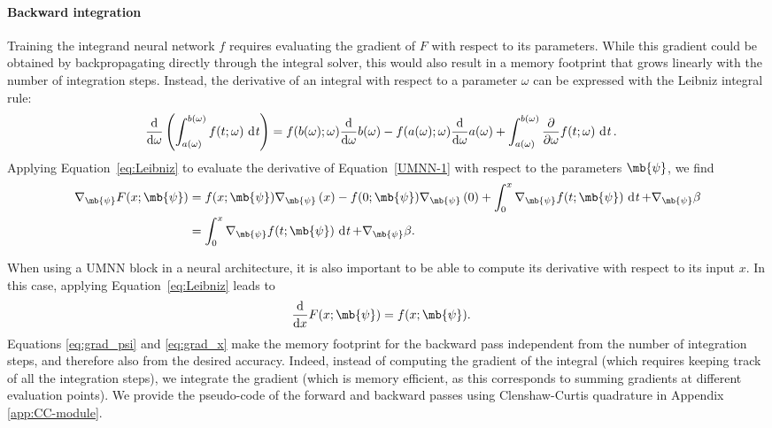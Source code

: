 \paragraph{Backward integration}
Training the integrand neural network $f$ requires evaluating the gradient of $F$ with respect to its parameters. While this gradient could be obtained by backpropagating directly through the integral solver, this would also result in a memory footprint that grows linearly with the number of integration steps. Instead, the derivative of an integral with respect to a parameter $\omega$ can be expressed with the Leibniz integral rule:
\begin{align}
    \frac{\mathrm{d}}{\mathrm{d} \omega}\left({\int^{b(\omega)}_{a(\omega)}f(t; \omega) \operatorname{\, \mathrm{d}\mathit{t}}}\right) &= f(b(\omega); \omega) \frac{\mathrm{d}}{\mathrm{d} \omega}b(\omega) - f(a(\omega);\omega) \frac{\mathrm{d}}{\mathrm{d}\omega}a(\omega) + \int^{b(\omega)}_{a(\omega)} \frac{\partial}{\partial \omega}f(t; \omega) \operatorname{\, \mathrm{d}\mathit{t}}. \label{eq:Leibniz}
\end{align}
Applying Equation~\eqref{eq:Leibniz} to evaluate the derivative of Equation~\eqref{UMNN-1} with respect to the parameters $\mb{\psi}$, we find
\begin{align}
    \nabla_{\mb{\psi}} F(x; \mb{\psi}) &= f(x; \mb{\psi}) \nabla_{\mb{\psi}}\brac{x} - f(0; \mb{\psi}) \nabla_{\mb{\psi}}\brac{0} + \int^x_0 \nabla_{\mb{\psi}} f(t; \mb{\psi}) \dt + \nabla_{\mb{\psi}}\beta\nonumber \\
    &= \int^x_0 \nabla_{\mb{\psi}} f(t; \mb{\psi}) \dt + \nabla_{\mb{\psi}}\beta. \label{eq:grad_psi}
\end{align}

When using a UMNN block in a neural architecture, it is also important to be able to compute its derivative with respect to its input $x$. In this case, applying Equation~\eqref{eq:Leibniz} leads to
\begin{align}
    \frac{\mathrm{d}}{\mathrm{d}x}F(x; \mb{\psi}) &= f(x; \mb{\psi}).\label{eq:grad_x}
\end{align}
Equations \eqref{eq:grad_psi} and \eqref{eq:grad_x} make the memory footprint for the backward pass independent from the number of integration steps, and therefore also from the desired accuracy. Indeed, instead of computing the gradient of the integral (which requires keeping track of all the integration steps), we integrate the gradient (which is memory efficient, as this corresponds to summing gradients at different evaluation points). We provide the pseudo-code of the forward and backward passes using Clenshaw-Curtis quadrature in Appendix \ref{app:CC-module}.

